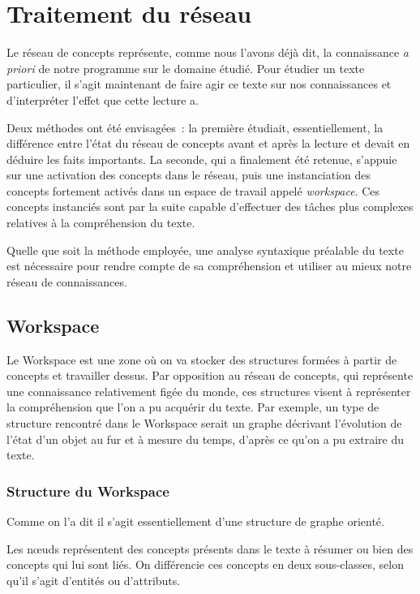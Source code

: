 \documentclass[a4paper, 12pt]{article}
\begin{document}
\section{Traitement du réseau}

Le réseau de concepts représente, comme nous l'avons déjà dit, la connaissance \textit{a priori} de notre programme sur le domaine étudié. Pour étudier un texte particulier, il s'agit maintenant de faire agir ce texte sur nos connaissances et d'interpréter l'effet que cette lecture a.

Deux méthodes ont été envisagées~: la première étudiait, essentiellement, la différence entre l'état du réseau de concepts avant et après la lecture et devait en déduire les faits importants. La seconde, qui a finalement été retenue, s'appuie sur une activation des concepts dans le réseau, puis une instanciation des concepts fortement activés dans un espace de travail appelé \textit{workspace}. Ces concepts instanciés sont par la suite capable d'effectuer des tâches plus complexes relatives à la compréhension du texte.

Quelle que soit la méthode employée, une analyse syntaxique préalable du texte est nécessaire pour rendre compte de sa compréhension et utiliser au mieux notre réseau de connaissances.

\subsection{Workspace}
Le Workspace est une zone où on va stocker des structures formées à partir de concepts et travailler dessus. Par opposition au réseau de concepts, qui représente une connaissance relativement figée du monde, ces structures visent à représenter la compréhension que l'on a pu acquérir du texte.
Par exemple, un type de structure rencontré dans le Workspace serait un graphe décrivant l'évolution de l'état d'un objet au fur et à mesure du temps, d'après ce qu'on a pu extraire du texte.

\subsubsection{Structure du Workspace}
Comme on l'a dit il s'agit essentiellement d'une structure de graphe orienté.

Les nœuds représentent des concepts présents dans le texte à résumer ou bien des concepts qui lui sont liés. On différencie ces concepts en deux sous-classes, selon qu'il s'agit d'entités ou d'attributs.
\end{document}
